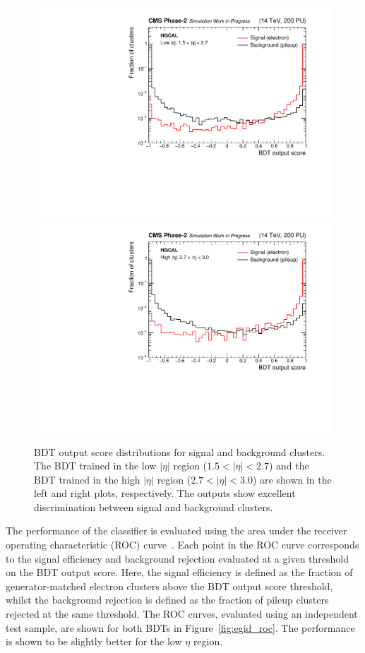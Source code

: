 \begin{figure}[htb!]
  \centering
  \includegraphics[width=.49\textwidth]{Figures/cms/egid/cl3d_bdt_electron_200PU_vs_neutrino_200PU_full_lo.pdf}
  \includegraphics[width=.49\textwidth]{Figures/cms/egid/cl3d_bdt_electron_200PU_vs_neutrino_200PU_full_hi.pdf}
  \caption[$e/\gamma$ identification output score distributions]
  {
    BDT output score distributions for signal and background clusters. The BDT trained in the low $|\eta|$ region ($1.5<|\eta|<2.7$) and the BDT trained in the high $|\eta|$ region ($2.7<|\eta|<3.0$) are shown in the left and right plots, respectively. The outputs show excellent discrimination between signal and background clusters.
  }
  \label{fig:egid_output}
\end{figure}

The performance of the classifier is evaluated using the area under the receiver operating characteristic (ROC) curve~\cite{roc}. Each point in the ROC curve corresponds to the signal efficiency and background rejection evaluated at a given threshold on the BDT output score. Here, the signal efficiency is defined as the fraction of generator-matched electron clusters above the BDT output score threshold, whilst the background rejection is defined as the fraction of pileup clusters rejected at the same threshold. The ROC curves, evaluated using an independent test sample, are shown for both BDTs in Figure~\ref{fig:egid_roc}. The performance is shown to be slightly better for the low $\eta$ region. 

